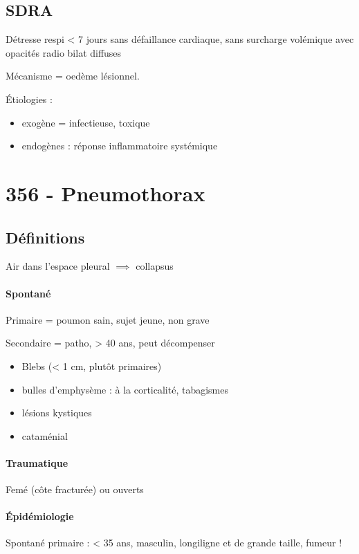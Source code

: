 \subsection{SDRA}
Détresse respi < 7 jours sans défaillance cardiaque, sans surcharge volémique
avec opacités radio bilat diffuses

Mécanisme = oedème lésionnel.

Étiologies :
\begin{itemize}
\item exogène = infectieuse, toxique
\item endogènes : réponse inflammatoire systémique
\end{itemize}

\section{356 - Pneumothorax}%

\subsection{Définitions}
Air dans l'espace pleural $\implies$ collapsus 

\paragraph{Spontané}
Primaire = poumon sain, sujet jeune, non grave

Secondaire = patho, > 40 ans, peut décompenser

\begin{itemize}
\item Blebs (< 1 cm, plutôt primaires)
\item bulles d'emphysème : à la corticalité, tabagismes
\item lésions kystiques
\item cataménial
\end{itemize}

\paragraph{Traumatique}
Femé (côte fracturée) ou ouverts

\paragraph{Épidémiologie}
Spontané primaire : < 35 ans, masculin, longiligne et de grande taille, fumeur !

